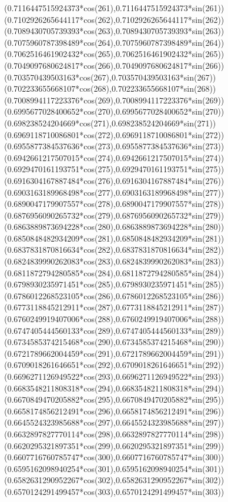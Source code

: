{({0.7116447515924373*cos(261)},{0.7116447515924373*sin(261)})
({0.7102926265644117*cos(262)},{0.7102926265644117*sin(262)})
({0.7089430705739393*cos(263)},{0.7089430705739393*sin(263)})
({0.7075960787398489*cos(264)},{0.7075960787398489*sin(264)})
({0.7062516461902432*cos(265)},{0.7062516461902432*sin(265)})
({0.7049097680624817*cos(266)},{0.7049097680624817*sin(266)})
({0.703570439503163*cos(267)},{0.703570439503163*sin(267)})
({0.702233655668107*cos(268)},{0.702233655668107*sin(268)})
({0.7008994117223376*cos(269)},{0.7008994117223376*sin(269)})
({0.6995677028400652*cos(270)},{0.6995677028400652*sin(270)})
({0.698238524204669*cos(271)},{0.698238524204669*sin(271)})
({0.6969118710086801*cos(272)},{0.6969118710086801*sin(272)})
({0.6955877384537636*cos(273)},{0.6955877384537636*sin(273)})
({0.6942661217507015*cos(274)},{0.6942661217507015*sin(274)})
({0.6929470161193751*cos(275)},{0.6929470161193751*sin(275)})
({0.6916304167887484*cos(276)},{0.6916304167887484*sin(276)})
({0.6903163189968498*cos(277)},{0.6903163189968498*sin(277)})
({0.6890047179907557*cos(278)},{0.6890047179907557*sin(278)})
({0.6876956090265732*cos(279)},{0.6876956090265732*sin(279)})
({0.6863889873694228*cos(280)},{0.6863889873694228*sin(280)})
({0.6850848482934209*cos(281)},{0.6850848482934209*sin(281)})
({0.6837831870816634*cos(282)},{0.6837831870816634*sin(282)})
({0.6824839990262083*cos(283)},{0.6824839990262083*sin(283)})
({0.6811872794280585*cos(284)},{0.6811872794280585*sin(284)})
({0.6798930235971451*cos(285)},{0.6798930235971451*sin(285)})
({0.6786012268523105*cos(286)},{0.6786012268523105*sin(286)})
({0.6773118845212911*cos(287)},{0.6773118845212911*sin(287)})
({0.6760249919407006*cos(288)},{0.6760249919407006*sin(288)})
({0.6747405444560133*cos(289)},{0.6747405444560133*sin(289)})
({0.6734585374215468*cos(290)},{0.6734585374215468*sin(290)})
({0.6721789662004459*cos(291)},{0.6721789662004459*sin(291)})
({0.6709018261646651*cos(292)},{0.6709018261646651*sin(292)})
({0.6696271126949522*cos(293)},{0.6696271126949522*sin(293)})
({0.6683548211808318*cos(294)},{0.6683548211808318*sin(294)})
({0.6670849470205882*cos(295)},{0.6670849470205882*sin(295)})
({0.6658174856212491*cos(296)},{0.6658174856212491*sin(296)})
({0.6645524323985688*cos(297)},{0.6645524323985688*sin(297)})
({0.6632897827770114*cos(298)},{0.6632897827770114*sin(298)})
({0.6620295321897351*cos(299)},{0.6620295321897351*sin(299)})
({0.6607716760785747*cos(300)},{0.6607716760785747*sin(300)})
({0.6595162098940254*cos(301)},{0.6595162098940254*sin(301)})
({0.6582631290952267*cos(302)},{0.6582631290952267*sin(302)})
({0.6570124291499457*cos(303)},{0.6570124291499457*sin(303)})
}
